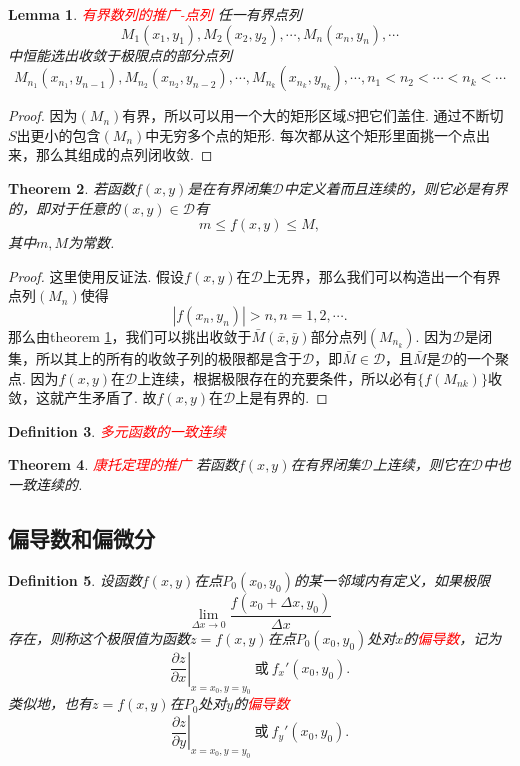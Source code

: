 \documentclass{article}
\newtheorem{theorem}{Theorem}[section]
\newtheorem{lemma}[theorem]{Lemma}
\newtheorem{definition}[theorem]{Definition}
\newcommand{\redt}[1]{\textcolor{red}{#1}}
\begin{document}
\begin{lemma}\label{point-sequence: bounded-then-coverage}
\rm \redt{有界数列的推广-点列} 任一有界点列
$$
M_1(x_1,y_1), M_2(x_2,y_2), \cdots , M_n(x_n,y_n),\cdots
$$
中恒能选出收敛于极限点的部分点列
$$
M_{n_1}(x_{n_1},y_{n-1}),M_{n_2}(x_{n_2},y_{n-2}),\cdots,M_{n_k}(x_{n_k},y_{n_k}),\cdots, n_1 < n_2 < \cdots < n_k <\cdots
$$
\end{lemma}

\begin{proof}
因为$(M_n)$有界，所以可以用一个大的矩形区域$S$把它们盖住. 通过不断切$S$出更小的包含$(M_n)$中无穷多个点的矩形. 每次都从这个矩形里面挑一个点出来，那么其组成的点列闭收敛. 
\end{proof}

\begin{theorem}
\rm  若函数$f(x,y)$是在有界闭集$\mathcal{D}$中定义着而且连续的，则它必是有界的，即对于任意的$(x,y) \in \mathcal{D}$有
$$
m \leq f(x,y) \leq M,
$$
其中$m,M$为常数.
\end{theorem}

\begin{proof}
\rm 这里使用反证法. 假设$f(x,y)$在$\mathcal{D}$上无界，那么我们可以构造出一个有界点列$(M_n)$使得
$$
|f(x_n,y_n)| > n , n =1,2,\cdots.
$$
那么由theorem \ref{point-sequence: bounded-then-coverage}，我们可以挑出收敛于$\bar{M}(\bar{x},\bar{y})$部分点列$(M_{n_k})$. 因为$\mathcal{D}$是闭集，所以其上的所有的收敛子列的极限都是含于$\mathcal{D}$，即$\bar{M} \in \mathcal{D}$，且$\bar{M}$是$\mathcal{D}$的一个聚点. 因为$f(x,y)$在$\mathcal{D}$上连续，根据极限存在的充要条件，所以必有$\{f(M_{nk})\}$收敛，这就产生矛盾了. 故$f(x,y)$在$\mathcal{D}$上是有界的. 
\end{proof}

\begin{definition}
\rm \redt{多元函数的一致连续} 
\end{definition}

\begin{theorem}
\rm \redt{康托定理的推广} 若函数$f(x,y)$在有界闭集$\mathcal{D}$上连续，则它在$\mathcal{D}$中也一致连续的. 
\end{theorem}

\newpage
\subsection{偏导数和偏微分}

\begin{definition}
\rm 设函数$f(x,y)$在点$P_0(x_0,y_0)$的某一邻域内有定义，如果极限
$$
\lim\limits_{\Delta x \to 0} \frac{f(x_0 + \Delta x,y_0)}{\Delta x}
$$
存在，则称这个极限值为函数$z = f(x,y)$在点$P_0(x_0,y_0)$处对$x$的\redt{偏导数}，记为
$$
\left.\frac{\partial z}{\partial x}\right|_{x=x_0,y=y_0} ~\text{或}~ f_x'(x_0,y_0).
$$
类似地，也有$z=f(x,y)$在$P_0$处对$y$的\redt{偏导数}
$$
\left.\frac{\partial z}{\partial y}\right|_{x=x_0,y=y_0} ~\text{或}~ f_y'(x_0,y_0).
$$
\end{definition}
\end{document}
